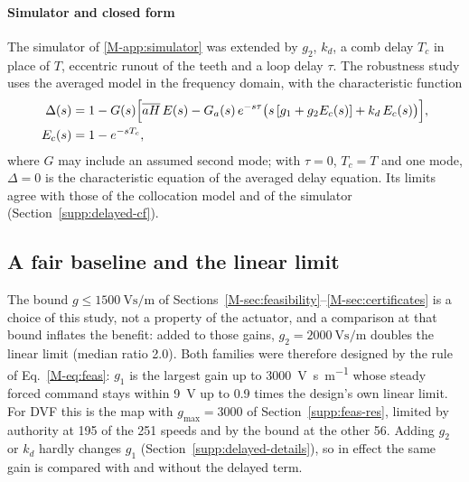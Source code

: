\paragraph{Simulator and closed form}
The simulator of \ref{M-app:simulator} was extended by $g_2$, $k_d$, a comb delay $T_c$ in place of $T$, eccentric runout of the teeth and a loop delay $\tau$. The robustness study uses the averaged model in the frequency domain, with the characteristic function
\begin{equation}\label{eq:comb-char}
  \begin{aligned}
    \Delta(s)&=1-G(s)\Bigl[\overline{aH}\,E(s)-G_a(s)\,e^{-s\tau}\bigl(s\,[g_1+g_2E_c(s)]+k_d\,E_c(s)\bigr)\Bigr],\\
    E_c(s)&=1-e^{-sT_c},
  \end{aligned}
\end{equation}
where $G$ may include an assumed second mode; with $\tau=0$, $T_c=T$ and one mode, $\Delta=0$ is the characteristic equation of the averaged delay equation. Its limits agree with those of the collocation model and of the simulator (Section~\ref{supp:delayed-cf}).

\subsection{A fair baseline and the linear limit}\label{supp:delayed-limit}

The bound $g\le\SI{1500}{\volt\second\per\metre}$ of Sections~\ref{M-sec:feasibility}--\ref{M-sec:certificates} is a choice of this study, not a property of the actuator, and a comparison at that bound inflates the benefit: added to those gains, $g_2=\SI{2000}{\volt\second\per\metre}$ doubles the linear limit (median ratio 2.0). Both families were therefore designed by the rule of Eq.~\eqref{M-eq:feas}: $g_1$ is the largest gain up to \SI{3000}{\volt\second\per\metre} whose steady forced command stays within \SI{9}{\volt} up to 0.9 times the design's own linear limit. For DVF this is the map with $g_{\max}=3000$ of Section~\ref{supp:feas-res}, limited by authority at 195 of the 251 speeds and by the bound at the other 56. Adding $g_2$ or $k_d$ hardly changes $g_1$ (Section~\ref{supp:delayed-details}), so in effect the same gain is compared with and without the delayed term.

